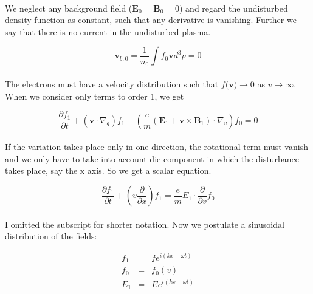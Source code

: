 \documentclass[a4paper,10pt]{report}
\begin{document}
\paragraph*{}
We neglect any background field ($\mathbf{E}_0=\mathbf{B}_0=0$) and regard the undisturbed density function as constant, such that any derivative is vanishing. Further we say that there is no current in the undisturbed plasma.

\begin{equation}
    \mathbf{v}_{b,0}=\frac{1}{n_0}\int{f_0\mathbf{v}d^3p}=0
\end{equation}

\paragraph*{}
The electrons must have a velocity distribution such that  $f(\textbf{v)}\rightarrow 0$ as $v\rightarrow \infty$. When we consider only terms to order 1, we get

\begin{equation}
 \frac{\partial f_1}{\partial t} + (\mathbf{v}\cdot \nabla_q) f_1-\left( \frac{e}{m}(\mathbf{E}_1+\mathbf{v}\times \mathbf{B}_1)\cdot\nabla_v \right) f_0 = 0
\end{equation}

\paragraph*{}
If the variation takes place only in one direction, the rotational term must vanish and we only have to take into account die component in which the disturbance takes place, say the x axis. So we get a scalar equation.

\begin{equation}
 \frac{\partial f_1}{\partial t} + \left( v \frac{\partial }{\partial x} \right) f_1 =  \frac{e}{m}E_1 \cdot \frac{\partial}{\partial v}  f_0
\end{equation}

\paragraph*{}
I omitted the subscript for shorter notation. Now we postulate a sinusoidal distribution of the fields:

\begin{eqnarray}
  f_1 &=& f e^{i(kx-\omega t)} \\
f_0 &=& f_0(v) \\
E_1 &=& E e^{i(kx-\omega t)}
\end{eqnarray}
\end{document}
